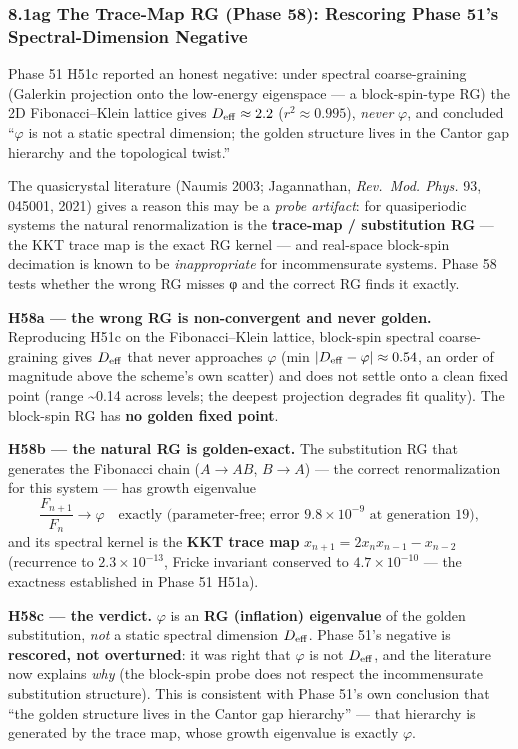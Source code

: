 \documentclass[
]{article}
\begin{document}
\subsubsection{8.1ag The Trace-Map RG (Phase 58): Rescoring Phase 51's
Spectral-Dimension
Negative}\label{ag-the-trace-map-rg-phase-58-rescoring-phase-51s-spectral-dimension-negative}

Phase 51 H51c reported an honest negative: under spectral
coarse-graining (Galerkin projection onto the low-energy eigenspace ---
a block-spin-type RG) the 2D Fibonacci--Klein lattice gives
\(D_{\rm eff} \approx 2.2\) (\(r^2 \approx 0.995\)), \emph{never}
\(\varphi\), and concluded ``\(\varphi\) is not a static spectral
dimension; the golden structure lives in the Cantor gap hierarchy and
the topological twist.''

The quasicrystal literature (Naumis 2003; Jagannathan, \emph{Rev.~Mod.
Phys.} 93, 045001, 2021) gives a reason this may be a \emph{probe
artifact}: for quasiperiodic systems the natural renormalization is the
\textbf{trace-map / substitution RG} --- the KKT trace map is the exact
RG kernel --- and real-space block-spin decimation is known to be
\emph{inappropriate} for incommensurate systems. Phase 58 tests whether
the wrong RG misses φ and the correct RG finds it exactly.

\textbf{H58a --- the wrong RG is non-convergent and never golden.}
Reproducing H51c on the Fibonacci--Klein lattice, block-spin spectral
coarse-graining gives \(D_{\rm eff}\) that never approaches \(\varphi\)
(min \(|D_{\rm eff}-\varphi| \approx 0.54\), an order of magnitude above
the scheme's own scatter) and does not settle onto a clean fixed point
(range \textasciitilde0.14 across levels; the deepest projection
degrades fit quality). The block-spin RG has \textbf{no golden fixed
point}.

\textbf{H58b --- the natural RG is golden-exact.} The substitution RG
that generates the Fibonacci chain (\(A\to AB\), \(B\to A\)) --- the
correct renormalization for this system --- has growth eigenvalue
\[\frac{F_{n+1}}{F_n} \to \varphi \quad\text{exactly (parameter-free; error } 9.8\times10^{-9}\text{ at generation 19)},\]
and its spectral kernel is the \textbf{KKT trace map}
\(x_{n+1} = 2 x_n x_{n-1} - x_{n-2}\) (recurrence to
\(2.3\times10^{-13}\), Fricke invariant conserved to
\(4.7\times10^{-10}\) --- the exactness established in Phase 51 H51a).

\textbf{H58c --- the verdict.} \(\varphi\) is an \textbf{RG (inflation)
eigenvalue} of the golden substitution, \emph{not} a static spectral
dimension \(D_{\rm eff}\). Phase 51's negative is \textbf{rescored, not
overturned}: it was right that \(\varphi\) is not \(D_{\rm eff}\), and
the literature now explains \emph{why} (the block-spin probe does not
respect the incommensurate substitution structure). This is consistent
with Phase 51's own conclusion that ``the golden structure lives in the
Cantor gap hierarchy'' --- that hierarchy is generated by the trace map,
whose growth eigenvalue is exactly \(\varphi\).
\end{document}
